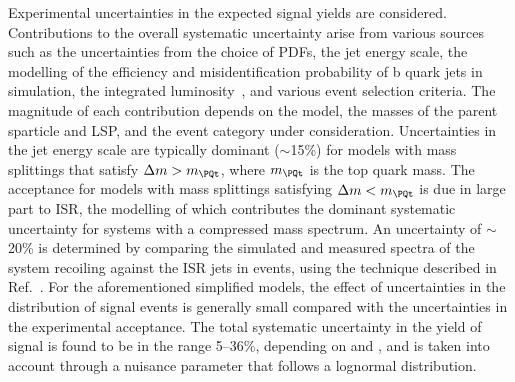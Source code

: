Experimental uncertainties in the expected signal yields are
considered. Contributions to the overall systematic uncertainty arise
from various sources such as the uncertainties from the choice of
PDFs, the jet energy scale, the modelling of the efficiency and
misidentification probability of b quark jets in simulation, the
integrated luminosity~\cite{lumi}, and various event selection
criteria. The magnitude of each contribution depends on the model, the
masses of the parent sparticle and LSP, and the event category under
consideration. Uncertainties in the jet energy scale are typically
dominant ($\sim$15\%) for models with mass splittings that satisfy
$\dm > m_\PQt$, where $m_\PQt$ is the top quark mass. The
acceptance for models with mass splittings satisfying $\dm <
m_\PQt$ is due in large part to ISR, the modelling of which
contributes the dominant systematic uncertainty for systems with a
compressed mass spectrum. An uncertainty of $\sim$20\% is determined
by comparing the simulated and measured \pt spectra of the system
recoiling against the ISR jets in \ttbar events, using the technique
described in Ref.~\cite{single-lepton-stop}. For the aforementioned
simplified models, the effect of uncertainties in the distribution of
signal events is generally small compared with the uncertainties in
the experimental acceptance. The total systematic uncertainty in the
yield of signal is found to be in the range 5--36\%, depending on
\njet and \nb, and is taken into account through a nuisance parameter
that follows a lognormal distribution.

